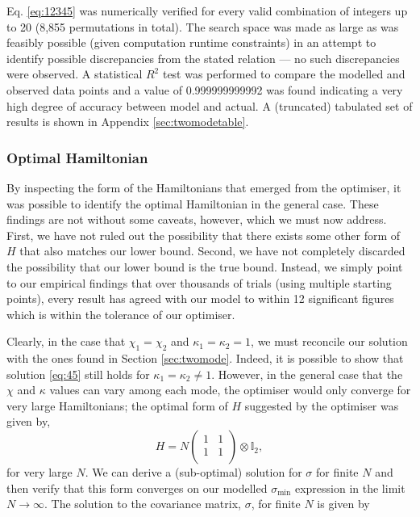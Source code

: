 \documentclass[11pt,a4paper]{article}
\numberwithin{equation}{section}
\begin{document}
	Eq. \ref{eq:12345} was numerically verified for every valid combination of integers up to 20 (8,855 permutations in total). The search space was made as large as was feasibly possible (given computation runtime constraints) in an attempt to identify possible discrepancies from the stated relation --- no such discrepancies were observed. A statistical $R^2$ test was performed to compare the modelled and observed data points and a value of 0.999999999992 was found indicating a very high degree of accuracy between model and actual. A (truncated) tabulated set of results is shown in Appendix \ref{sec:twomodetable}.
	
	\subsubsection{Optimal Hamiltonian}
	
	By inspecting the form of the Hamiltonians that emerged from the optimiser, it was possible to identify the optimal Hamiltonian in the general case. These findings are not without some caveats, however, which we must now address. First, we have not ruled out the possibility that there exists some other form of $H$ that also matches our lower bound. Second, we have not completely discarded the possibility that our lower bound is the true bound. Instead, we simply point to our empirical findings that over thousands of trials (using multiple starting points), every result has agreed with our model to within 12 significant figures which is within the tolerance of our optimiser.
	
	Clearly, in the case that $\chi_1=\chi_2$ and $\kappa_1=\kappa_2=1$, we must reconcile our solution with the ones found in Section \ref{sec:twomode}. Indeed, it is possible to show that solution \ref{eq:45} still holds for $\kappa_1=\kappa_2\neq1$. However, in the general case that the $\chi$ and $\kappa$ values can vary among each mode, the optimiser would only converge for very large Hamiltonians; the optimal form of $H$ suggested by the optimiser was given by,
	\begin{equation*}
	H = N \begin{pmatrix}
	1 & 1 \\
	1 & 1\\
	\end{pmatrix} \otimes \mathbb{I}_2,
	\end{equation*}
	for very large $N$. We can derive a (sub-optimal) solution for $\sigma$ for finite $N$ and then verify that this form converges on our modelled $\sigma_\text{min}$ expression in the limit $N \rightarrow \infty$.	The solution to the covariance matrix, $\sigma$, for finite $N$ is given by 
	
\end{document}
